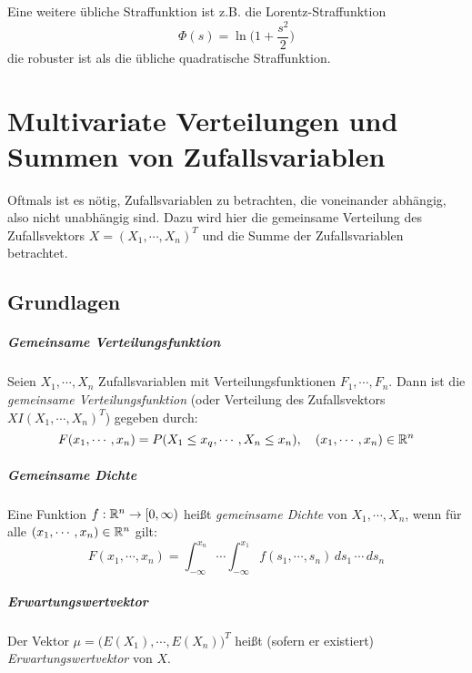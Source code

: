 			Eine weitere übliche Straffunktion ist z.B. die Lorentz-Straffunktion
			\begin{equation*}
				\Phi(s) = \ln\Big(1 + \frac{s^2}{2}\Big)
			\end{equation*}
			die robuster ist als die übliche quadratische Straffunktion.

\chapter{Multivariate Verteilungen und Summen von Zufallsvariablen}
	Oftmals ist es nötig, Zufallsvariablen zu betrachten, die voneinander abhängig, also nicht unabhängig sind. Dazu wird hier die gemeinsame Verteilung des Zufallsvektors \( X = (X_1, \cdots, X_n)^T \) und die Summe der Zufallsvariablen betrachtet.

	\section{Grundlagen}
		\paragraph{Gemeinsame Verteilungsfunktion}
			Seien \( X_1, \cdots, X_n \) Zufallsvariablen mit Verteilungsfunktionen \( F_1, \cdots, F_n \). Dann ist die \textit{gemeinsame Verteilungsfunktion} (oder Verteilung des Zufallsvektors \( X I (X_1, \cdots, X_n)^T \)) gegeben durch:
			\begin{equation*}
				F(x_1, \cdots, x_n) = P(X_1 \leq x_q, \cdots, X_n \leq x_n), \quad (x_1, \cdots, x_n) \in \mathbb{R}^n
			\end{equation*}

		\paragraph{Gemeinsame Dichte}
			Eine Funktion \( f : \mathbb{R}^n \rightarrow [0, \infty) \) heißt \textit{gemeinsame Dichte} von \( X_1, \cdots, X_n \), wenn für alle \( (x_1, \cdots, x_n) \in \mathbb{R}^n \) gilt:
			\begin{equation*}
				F(x_1, \cdots, x_n) = \int_{-\infty}^{x_n} \! \cdots \int_{-\infty}^{x_1} \! f(s_1, \cdots, s_n) \, ds_1 \, \cdots \, ds_n
			\end{equation*}

		\paragraph{Erwartungswertvektor}
			Der Vektor \( \mu = \big( E(X_1), \cdots, E(X_n) \big)^T \) heißt (sofern er existiert) \textit{Erwartungswertvektor} von \(X\).

